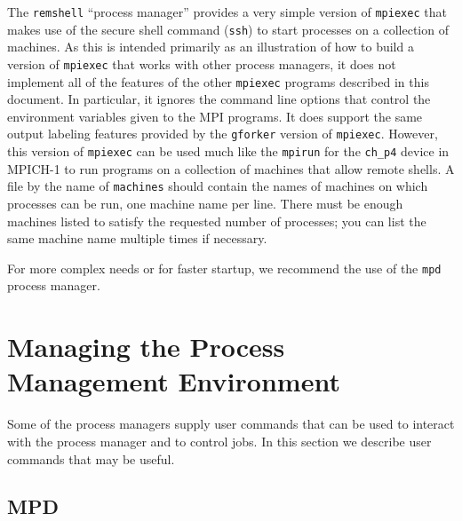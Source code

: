 \documentclass[dvipdfm,11pt]{article}
\begin{document}
The \texttt{remshell} ``process manager'' provides a very simple version of
\texttt{mpiexec} that makes use of the secure shell command (\texttt{ssh}) to
start processes on a collection of machines.  As this is intended primarily as
an illustration of how to build a version of \texttt{mpiexec} that works with
other process managers, it does not implement all of the features of the other
\texttt{mpiexec} programs described in this document.  In particular, it
ignores the command line options that control the environment variables given
to the MPI programs.  It does support the same output labeling features
provided by the \texttt{gforker} version of \texttt{mpiexec}. 
However, this version of \texttt{mpiexec} can be used
much like the \texttt{mpirun} for the \texttt{ch\_p4} device in MPICH-1 to run
programs on a collection of machines that allow remote shells.  A file by the
name of \texttt{machines} should contain the names of machines on which
processes can be run, one machine name per line.  There must be enough
machines listed to satisfy the requested number of processes; you can list the
same machine name multiple times if necessary.  

For more complex needs or for faster startup, we recommend the use of the
\texttt{mpd} process manager.

\section{Managing the Process Management Environment}
\label{sec:managing-pme}

Some of the process managers supply user commands that can be used to
interact with the process manager and to control jobs.  In this section
we describe user commands that may be useful.

\subsection{MPD}
\label{sec:managing-mpd}
\end{document}
